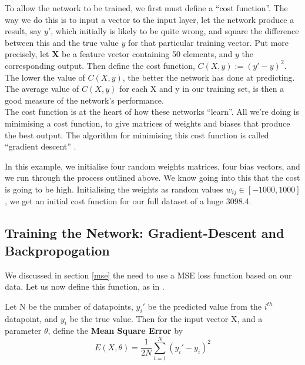 To allow the network to be trained, we first must define a ``cost function''. The way we do this is to input a vector to the input layer, let the network produce a result, say $y'$, which
initially is likely to be quite wrong, and square the difference between this and the true value $y$ for that particular training vector. Put more precisely,
let \textbf{X} be a feature vector containing 50 elements, and $y$ the corresponding output. Then define the cost function, $C(X,y) := (y'-y)^2$. The lower the value of $C(X,y)$, the 
better the network has done at predicting. The average value of $C(X,y)$ for each X and y in our training set, is then a good measure of the network's performance. \\

The cost function is at the heart of how these networks ``learn''. All we're doing is minimising a cost function, to give matrices of weights and biases that
produce the best output. The algorithm for minimising this cost function is called ``gradient descent'' \cite{cauchy}.

\begin{example}
    In this example, we initialise four random weights matrices, four bias vectors, and we run through the process outlined above. We know going into this that 
    the cost is going to be high. Initialising the weights as random values $w_{ij} \in [-1000,1000]$, we get an initial cost function for our full dataset of a huge
    3098.4. 
\end{example}

\subsection{Training the Network: Gradient-Descent and Backpropogation}

We discussed in section \ref{mse} the need to use a MSE loss function based on our data. Let us now define this function, as in \cite{huber}.

\begin{definition}
    Let N be the number of datapoints, $y_i'$ be the predicted value from the $i^{th}$ datapoint, and $y_i$ be the true value. Then for the input vector X, and a parameter $\theta$,
    define the \textbf{Mean Square Error} by
    \begin{equation}
        E(X,\theta) = \frac{1}{2N}\sum^N_{i=1}(y_i'-y_i)^2
    \end{equation}
\end{definition}

